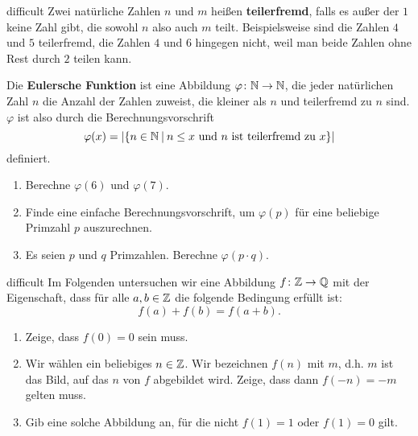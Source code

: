 \documentclass[../abbildungen.tex]{subfiles}
\begin{document}
\begin{exercise}{difficult}
    Zwei natürliche Zahlen $n$ und $m$ heißen \textbf{teilerfremd}, falls es außer der $1$ keine Zahl gibt, die sowohl $n$ also auch $m$ teilt. Beispielsweise sind die Zahlen $4$ und $5$ teilerfremd, die Zahlen $4$ und $6$ hingegen nicht, weil man beide Zahlen ohne Rest durch $2$ teilen kann.
    
    Die \textbf{Eulersche Funktion} ist eine Abbildung $\varphi\colon\mathbb{N}\rightarrow\mathbb{N}$, die jeder natürlichen Zahl $n$ die Anzahl der Zahlen zuweist, die kleiner als $n$ und teilerfremd zu $n$ sind. $\varphi$ ist also durch die Berechnungsvorschrift \[\varphi(x)=\lvert\{n\in\mathbb{N}\:|\:n\leq x\text{~und~}n\text{~ist teilerfremd zu~}x\}\rvert\] definiert.
    \begin{enumerate}
        \item Berechne $\varphi(6)$ und $\varphi(7)$.
        \item Finde eine einfache Berechnungsvorschrift, um $\varphi(p)$ für eine beliebige Primzahl $p$ auszurechnen.
        \item Es seien $p$ und $q$ Primzahlen. Berechne $\varphi(p\cdot q)$.
    \end{enumerate}
\end{exercise}
\begin{exercise}{difficult}
    Im Folgenden untersuchen wir eine Abbildung $f\colon\mathbb{Z}\rightarrow\mathbb{Q}$ mit der Eigenschaft, dass für alle $a,b\in\mathbb{Z}$ die folgende Bedingung erfüllt ist:\[f(a)+f(b)=f(a+b).\]
    \begin{enumerate}
        \item Zeige, dass $f(0)=0$ sein muss.
        \item Wir wählen ein beliebiges $n\in\mathbb{Z}$. Wir bezeichnen $f(n)$ mit $m$, d.h. $m$ ist das Bild, auf das $n$ von $f$ abgebildet wird. Zeige, dass dann $f(-n)=-m$ gelten muss.
        \item Gib eine solche Abbildung an, für die nicht $f(1)=1$ oder $f(1)=0$ gilt.
        
    \end{enumerate}
\end{exercise}
\end{document}
